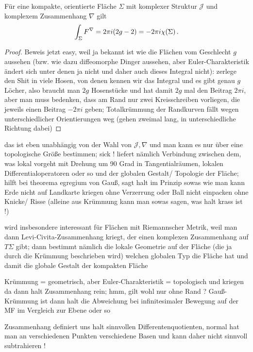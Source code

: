 \documentclass[../H_Analysis_main.tex]{subfiles}
\begin{document}
\begin{satz}
Für eine kompakte, orientierte Fläche $\Sigma$ mit komplexer Struktur $\mathcal{J}$ und komplexem Zusammenhang $\nabla$ gilt
\begin{equation}
\int_\Sigma F^\nabla = 2 \pi i \qty(2 g - 2) = - 2\pi i \chi(\Sigma) \, .
\end{equation}
\end{satz}
\begin{proof}
Beweis jetzt easy, weil ja bekannt ist wie die Flächen vom Geschlecht $g$ aussehen (bzw. wie dazu diffeomorphe Dinger aussehen, aber Euler-Charakteristik ändert sich unter denen ja nicht und daher auch dieses Integral nicht): zerlege den Shit in viele Hosen, von denen kennen wir das Integral und es gibt genau $g$ Löcher, also braucht man $2g$ Hosenstücke und hat damit $2g$ mal den Beitrag $2 \pi i$, aber man muss bedenken, dass am Rand nur zwei Kreisschreiben vorliegen, die jeweils einen Beitrag $-2 \pi i$ geben; Totalkrümmung der Randkurven fällt wegen unterschiedlicher Orientierungen weg (gehen zweimal lang, in unterschiedliche Richtung dabei)
\end{proof}
das ist eben unabhängig von der Wahl von $\mathcal{J}, \nabla$ und man kann es nur über eine topologische Größe bestimmen; sick ! liefert nämlich Verbindung zwischen dem, was lokal vorgeht mit Drehung um 90 Grad in Tangentialräumen, lokalen Differentialoperatoren oder so und der globalen Gestalt/ Topologie der Fläche; hilft bei theorema egregium von Gauß, sagt halt im Prinzip sowas wie man kann Erde nicht auf Landkarte kriegen ohne Verzerrung oder Ball nicht einpacken ohne Knicke/ Risse (alleine aus Krümmung kann man sowas sagen, was halt krass ist !)


wird insbesondere interessant für Flächen mit Riemannscher Metrik, weil man dann Levi-Civita-Zusammenhang kriegt, der einen komplexen Zusammenhang auf $T\Sigma$ gibt; dann bestimmt nämlich die lokale Geometrie auf der Fläche (die ja durch die Krümmung beschrieben wird) welchen globalen Typ die Fläche hat und damit die globale Gestalt der kompakten Fläche


Krümmung = geometrisch, aber Euler-Charakteristik = topologisch und kriegen da dann halt Zusammenhang rein; hmm, gilt wohl nur ohne Rand ? Gauß-Krümmung ist dann halt die Abweichung bei infinitesimaler Bewegung auf der MF im Vergleich zur Ebene oder so

Zusammenhang definiert uns halt sinnvollen Differentenquotienten, normal hat man an verschiedenen Punkten verschiedene Basen und kann daher nicht sinnvoll subtrahieren !
\end{document}
